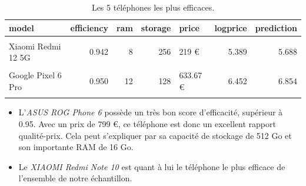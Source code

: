 \documentclass[
  12pt,
]{report}
\begin{document}
\begin{table}[!h]

\caption{\label{tab:best}Les 5 téléphones les plus efficaces.}
\centering
\begin{tabular}[t]{lrrrlrr}
\toprule
\textbf{model} & \textbf{efficiency} & \textbf{ram} & \textbf{storage} & \textbf{price} & \textbf{logprice} & \textbf{prediction}\\
\midrule
\cellcolor{gray!6}{OPPO Find X3 Lite} & \cellcolor{gray!6}{0.941} & \cellcolor{gray!6}{8} & \cellcolor{gray!6}{128} & \cellcolor{gray!6}{259.06 €} & \cellcolor{gray!6}{5.557} & \cellcolor{gray!6}{5.850}\\
Xiaomi Redmi 12 5G & 0.942 & 8 & 256 & 219 € & 5.389 & 5.688\\
\cellcolor{gray!6}{ASUS ROG Phone 6} & \cellcolor{gray!6}{0.949} & \cellcolor{gray!6}{16} & \cellcolor{gray!6}{512} & \cellcolor{gray!6}{799 €} & \cellcolor{gray!6}{6.683} & \cellcolor{gray!6}{7.069}\\
Google Pixel 6 Pro & 0.950 & 12 & 128 & 633.67 € & 6.452 & 6.854\\
\cellcolor{gray!6}{XIAOMI Redmi Note 10} & \cellcolor{gray!6}{0.956} & \cellcolor{gray!6}{4} & \cellcolor{gray!6}{64} & \cellcolor{gray!6}{159 €} & \cellcolor{gray!6}{5.069} & \cellcolor{gray!6}{5.566}\\
\bottomrule
\end{tabular}
\end{table}

\begin{itemize}
\item
  L'\emph{ASUS ROG Phone 6} possède un très bon score d'efficacité,
  supérieur à 0.95. Avec un prix de 799 €, ce téléphone est donc un
  excellent rapport qualité-prix. Cela peut s'expliquer par sa capacité
  de stockage de 512 Go et son importante RAM de 16 Go.
\item
  Le \emph{XIAOMI Redmi Note 10} est quant à lui le téléphone le plus
  efficace de l'ensemble de notre échantillon.
\end{itemize}
\end{document}
